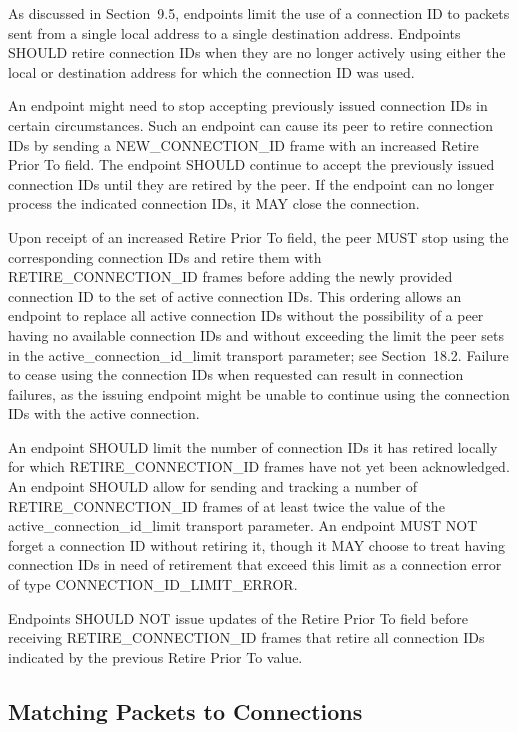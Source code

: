 \documentclass{article}
\begin{document}
As discussed in Section~9.5, endpoints limit the use of a connection ID to packets sent from a single local address to a single destination address.  Endpoints SHOULD retire connection IDs when they are no longer actively using either the local or destination address for which the connection ID was used.

An endpoint might need to stop accepting previously issued connection IDs in certain circumstances.  Such an endpoint can cause its peer to retire connection IDs by sending a NEW\_CONNECTION\_ID frame with an increased Retire Prior To field.  The endpoint SHOULD continue to accept the previously issued connection IDs until they are retired by the peer.  If the endpoint can no longer process the indicated connection IDs, it MAY close the connection.

Upon receipt of an increased Retire Prior To field, the peer MUST stop using the corresponding connection IDs and retire them with RETIRE\_CONNECTION\_ID frames before adding the newly provided connection ID to the set of active connection IDs.  This ordering allows an endpoint to replace all active connection IDs without the possibility of a peer having no available connection IDs and without exceeding the limit the peer sets in the active\_connection\_id\_limit transport parameter; see Section~18.2.  Failure to cease using the connection IDs when requested can result in connection failures, as the issuing endpoint might be unable to continue using the connection IDs with the active connection.

An endpoint SHOULD limit the number of connection IDs it has retired locally for which RETIRE\_CONNECTION\_ID frames have not yet been acknowledged.  An endpoint SHOULD allow for sending and tracking a number of RETIRE\_CONNECTION\_ID frames of at least twice the value of the active\_connection\_id\_limit transport parameter.  An endpoint MUST NOT forget a connection ID without retiring it, though it MAY choose to treat having connection IDs in need of retirement that exceed this limit as a connection error of type CONNECTION\_ID\_LIMIT\_ERROR.

Endpoints SHOULD NOT issue updates of the Retire Prior To field before receiving RETIRE\_CONNECTION\_ID frames that retire all connection IDs indicated by the previous Retire Prior To value.

\subsection{Matching Packets to Connections}
\end{document}
